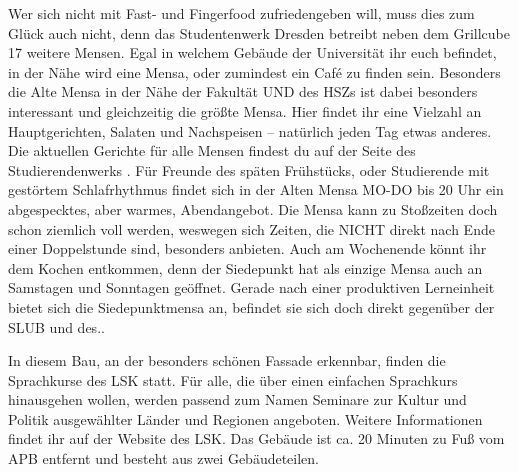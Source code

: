 Wer sich nicht mit Fast- und Fingerfood zufriedengeben will, muss dies zum Glück auch nicht, denn das Studentenwerk Dresden betreibt neben dem Grillcube 17 weitere Mensen.
Egal in welchem Gebäude der Universität ihr euch befindet, in der Nähe wird eine Mensa, oder zumindest ein Café zu finden sein.
Besonders die Alte Mensa in der Nähe der Fakultät UND des HSZs ist dabei besonders interessant und gleichzeitig die größte Mensa.
Hier findet ihr eine Vielzahl an Hauptgerichten, Salaten und Nachspeisen -- natürlich jeden Tag etwas anderes.
Die aktuellen Gerichte für alle Mensen findest du auf der Seite des Studierendenwerks .
Für Freunde des späten Frühstücks, oder Studierende mit gestörtem Schlafrhythmus findet sich in der Alten Mensa MO-DO bis 20 Uhr ein abgespecktes, aber warmes, Abendangebot.
Die Mensa kann zu Stoßzeiten doch schon ziemlich voll werden, weswegen sich Zeiten, die NICHT direkt nach Ende einer Doppelstunde sind, besonders anbieten.
Auch am Wochenende könnt ihr dem Kochen entkommen, denn der Siedepunkt hat als einzige Mensa auch an Samstagen und Sonntagen geöffnet.
Gerade nach einer produktiven Lerneinheit bietet sich die Siedepunktmensa an, befindet sie sich doch direkt gegenüber der SLUB und des..


In diesem Bau, an der besonders schönen Fassade erkennbar, finden die Sprachkurse des LSK statt.
Für alle, die über einen einfachen Sprachkurs hinausgehen wollen, werden passend zum Namen Seminare zur Kultur und Politik ausgewählter Länder und Regionen angeboten.
Weitere Informationen findet ihr auf der Website des LSK.
Das Gebäude ist ca. 20 Minuten zu Fuß vom APB entfernt und besteht aus zwei Gebäudeteilen.
